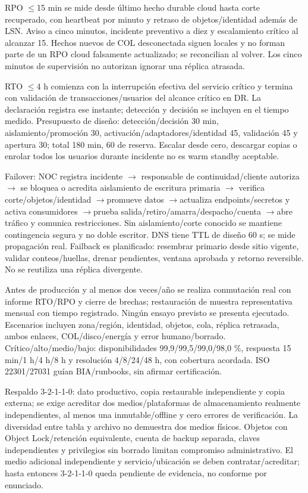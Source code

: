 \documentclass[11pt,letterpaper]{report}
\begin{document}
RPO $\leq$15 min se mide desde último hecho durable cloud hasta corte recuperado, con heartbeat por minuto y retraso de objetos/identidad además de LSN. Aviso a cinco minutos, incidente preventivo a diez y escalamiento crítico al alcanzar 15. Hechos nuevos de COL desconectada siguen locales y no forman parte de un RPO cloud falsamente actualizado; se reconcilian al volver. Los cinco minutos de supervisión no autorizan ignorar una réplica atrasada.

RTO $\leq$4 h comienza con la interrupción efectiva del servicio crítico y termina con validación de transacciones/usuarios del alcance crítico en DR. La declaración registra ese instante; detección y decisión se incluyen en el tiempo medido. Presupuesto de diseño: detección/decisión 30 min, aislamiento/promoción 30, activación/adaptadores/identidad 45, validación 45 y apertura 30; total 180 min, 60 de reserva. Escalar desde cero, descargar copias o enrolar todos los usuarios durante incidente no es warm standby aceptable.

Failover: NOC registra incidente $\rightarrow$ responsable de continuidad/cliente autoriza $\rightarrow$ se bloquea o acredita aislamiento de escritura primaria $\rightarrow$ verifica corte/objetos/identidad $\rightarrow$promueve datos $\rightarrow$actualiza endpoints/secretos y activa consumidores $\rightarrow$prueba salida/retiro/amarra/despacho/cuenta $\rightarrow$abre tráfico y comunica restricciones. Sin aislamiento/corte conocido se mantiene contingencia segura y no doble escritor. DNS tiene TTL de diseño 60 s; se mide propagación real. Failback es planificado: resembrar primario desde sitio vigente, validar conteos/huellas, drenar pendientes, ventana aprobada y retorno reversible. No se reutiliza una réplica divergente.

Antes de producción y al menos dos veces/año se realiza conmutación real con informe RTO/RPO y cierre de brechas; restauración de muestra representativa mensual con tiempo registrado. Ningún ensayo previsto se presenta ejecutado. Escenarios incluyen zona/región, identidad, objetos, cola, réplica retrasada, ambos enlaces, COL/disco/energía y error humano/borrado. Crítico/alto/medio/bajo: disponibilidades 99,9/99,5/99,0/98,0 \%, respuesta 15 min/1 h/4 h/8 h y resolución 4/8/24/48 h, con cobertura acordada. ISO 22301/27031 guían BIA/runbooks, sin afirmar certificación.

Respaldo 3-2-1-1-0: dato productivo, copia restaurable independiente y copia externa; se exige acreditar dos medios/plataformas de almacenamiento realmente independientes, al menos una inmutable/offline y cero errores de verificación. La diversidad entre tabla y archivo no demuestra dos medios físicos. Objetos con Object Lock/retención equivalente, cuenta de backup separada, claves independientes y privilegios sin borrado limitan compromiso administrativo. El medio adicional independiente y servicio/ubicación se deben contratar/acreditar; hasta entonces 3-2-1-1-0 queda pendiente de evidencia, no conforme por enunciado.
\end{document}
